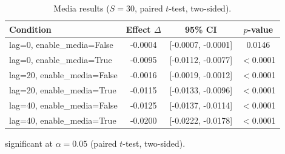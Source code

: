 \begin{table}[t]
  \centering
  \caption{Media results ($S=30$, paired $t$-test, two-sided).}
  \label{tab:media}
  \begin{tabular}{lccc}
    \toprule
    Condition & Effect $\Delta$ & 95\% CI & $p$-value \\
    \midrule
    lag=0, enable_media=False & -0.0004\dag{} & [-0.0007, -0.0001] & 0.0146 \\
    lag=0, enable_media=True & -0.0095\dag{} & [-0.0112, -0.0077] & $<$0.0001 \\
    lag=20, enable_media=False & -0.0016\dag{} & [-0.0019, -0.0012] & $<$0.0001 \\
    lag=20, enable_media=True & -0.0115\dag{} & [-0.0133, -0.0096] & $<$0.0001 \\
    lag=40, enable_media=False & -0.0125\dag{} & [-0.0137, -0.0114] & $<$0.0001 \\
    lag=40, enable_media=True & -0.0200\dag{} & [-0.0222, -0.0178] & $<$0.0001 \\
    \bottomrule
  \end{tabular}
  \begin{minipage}{\linewidth}
    \vspace{4pt}
    \footnotesize \dag{} significant at $\alpha = 0.05$ (paired $t$-test, two-sided).
  \end{minipage}
\end{table}